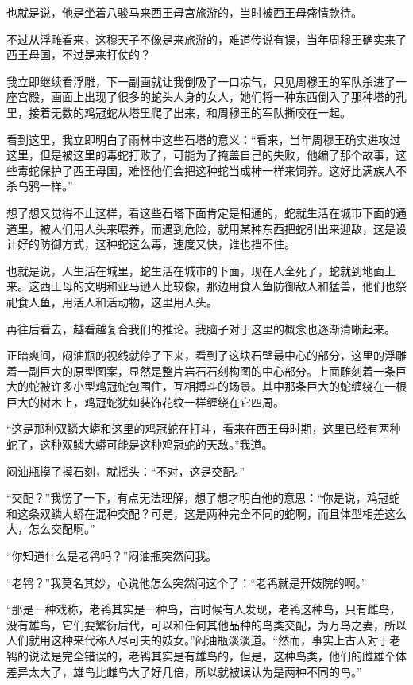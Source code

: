 也就是说，他是坐着八骏马来西王母宫旅游的，当时被西王母盛情款待。

不过从浮雕看来，这穆天子不像是来旅游的，难道传说有误，当年周穆王确实来了西王母国，不过是来打仗的？

我立即继续看浮雕，下一副画就让我倒吸了一口凉气，只见周穆王的军队杀进了一座宫殿，画面上出现了很多的蛇头人身的女人，她们将一种东西倒入了那种塔的孔里，接着无数的鸡冠蛇从塔里爬了出来，和周穆王的军队撕咬在一起。

看到这里，我立即明白了雨林中这些石塔的意义：“看来，当年周穆王确实进攻过这里，但是被这里的毒蛇打败了，可能为了掩盖自己的失败，他编了那个故事，这些毒蛇保护了西王母国，难怪他们会把这种蛇当成神一样来饲养。这好比满族人不杀乌鸦一样。”

想了想又觉得不止这样，看这些石塔下面肯定是相通的，蛇就生活在城市下面的通道里，被人们用人头来喂养，而遇到危险，就用某种东西把蛇引出来迎敌，这是设计好的防御方式，这种蛇这么毒，速度又快，谁也挡不住。

也就是说，人生活在城里，蛇生活在城市的下面，现在人全死了，蛇就到地面上来。这西王母的文明和亚马逊人比较像，那边用食人鱼防御敌人和猛兽，他们也祭祀食人鱼，用活人和活动物，这里用人头。

再往后看去，越看越复合我们的推论。我脑子对于这里的概念也逐渐清晰起来。

正暗爽间，闷油瓶的视线就停了下来，看到了这块石壁最中心的部分，这里的浮雕着一副巨大的原型图案，显然是整片岩石石刻构图的中心部分。上面雕刻着一条巨大的蛇被许多小型鸡冠蛇包围住，互相搏斗的场景。其中那条巨大的蛇缠绕在一根巨大的树木上，鸡冠蛇犹如装饰花纹一样缠绕在它四周。

“这是那种双鳞大蟒和这里的鸡冠蛇在打斗，看来在西王母时期，这里已经有两种蛇了，这种双鳞大蟒可能是这种鸡冠蛇的天敌。”我道。

闷油瓶摸了摸石刻，就摇头：“不对，这是交配。”

“交配？”我愣了一下，有点无法理解，想了想才明白他的意思：“你是说，鸡冠蛇和这条双鳞大蟒在混种交配？可是，这是两种完全不同的蛇啊，而且体型相差这么大，怎么交配啊。”

“你知道什么是老鸨吗？”闷油瓶突然问我。

“老鸨？”我莫名其妙，心说他怎么突然问这个了：“老鸨就是开妓院的啊。”

“那是一种戏称，老鸨其实是一种鸟，古时候有人发现，老鸨这种鸟，只有雌鸟，没有雄鸟，它们要繁衍后代，可以和任何其他品种的鸟类交配，为万鸟之妻，所以人们就用这种来代称人尽可夫的妓女。”闷油瓶淡淡道。“然而，事实上古人对于老鸨的说法是完全错误的，老鸨其实是有雄鸟的，但是，这种鸟类，他们的雌雄个体差异太大了，雄鸟比雌鸟大了好几倍，所以就被误认为是两种不同的鸟。”

